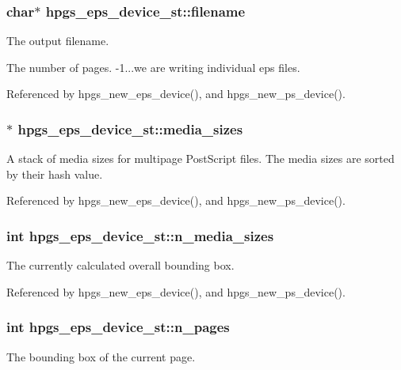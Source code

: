 \subsubsection[{filename}]{\setlength{\rightskip}{0pt plus 5cm}char$\ast$ {\bf hpgs\_\-eps\_\-device\_\-st::filename}}\label{structhpgs__eps__device__st_a9852d09a4f1530b05fb1bc4d64912f4b}


The output filename. 

The number of pages. -\/1...we are writing individual eps files. 

Referenced by hpgs\_\-new\_\-eps\_\-device(), and hpgs\_\-new\_\-ps\_\-device().

\subsubsection[{media\_\-sizes}]{$\ast$ {\bf hpgs\_\-eps\_\-device\_\-st::media\_\-sizes}}\label{structhpgs__eps__device__st_a578308a5c4ae9cec6a37d3e8c85ebc09}
A stack of media sizes for multipage PostScript files. The media sizes are sorted by their hash value. 

Referenced by hpgs\_\-new\_\-eps\_\-device(), and hpgs\_\-new\_\-ps\_\-device().

\subsubsection[{n\_\-media\_\-sizes}]{\setlength{\rightskip}{0pt plus 5cm}int {\bf hpgs\_\-eps\_\-device\_\-st::n\_\-media\_\-sizes}}\label{structhpgs__eps__device__st_a5a86f397ff80fb7ce5b8548a8ae7ca3f}
The currently calculated overall bounding box. 

Referenced by hpgs\_\-new\_\-eps\_\-device(), and hpgs\_\-new\_\-ps\_\-device().

\subsubsection[{n\_\-pages}]{\setlength{\rightskip}{0pt plus 5cm}int {\bf hpgs\_\-eps\_\-device\_\-st::n\_\-pages}}\label{structhpgs__eps__device__st_a00716a164dab36095ca4daba2ff43fc4}
The bounding box of the current page. 

